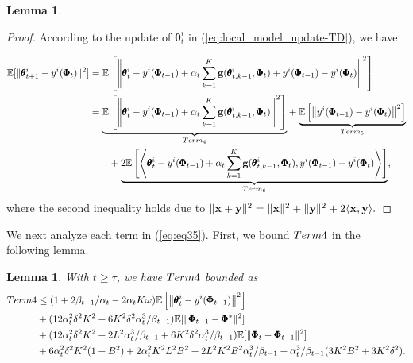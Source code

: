 \documentclass{article} %
\def\eqref#1{equation~\ref{#1}}
\theoremstyle{plain}
\newtheorem{lemma}[theorem]{Lemma}
\theoremstyle{definition}
\theoremstyle{remark}
\renewcommand{\eqref}[1]{(\ref{#1})}
\begin{document}
{\begin{lemma}
\end{lemma}


\begin{proof}
According to the  update of $\pmb{\theta}_t^i$ in \eqref{eq:local_model_update-TD}, we have

\begin{align}\label{eq:eq35}
    \mathbb{E}[\|\pmb{\theta}^i_{t+1}-y^i(\pmb{\Phi}_t)\|^2]&=\mathbb{E}\left[\left\|\pmb{\theta}_{t}^i-y^i(\pmb{\Phi}_{t-1})+\alpha_t\sum_{k=1}^K\bg(\pmb{\theta}_{t,k-1}^i,\pmb{\Phi}_t)+y^i(\pmb{\Phi}_{t-1})-y^i(\pmb{\Phi}_{t})\right\|^2\right]\nonumber\allowdisplaybreaks\\
    &=\underset{Term_4}{\underbrace{\mathbb{E} \left[\left\|\pmb{\theta}_{t}^i-y^i(\pmb{\Phi}_{t-1})+\alpha_t\sum_{k=1}^K\bg(\pmb{\theta}_{t,k-1}^i,\pmb{\Phi}_t)\right\|^2\right]}}+\underset{Term_5}{\underbrace{\mathbb{E}\left[\left\|y^i(\pmb{\Phi}_{t-1})-y^i(\pmb{\Phi}_{t})\right\|^2\right]}}\nonumber\allowdisplaybreaks\\
    &\qquad+\underset{Term_6}{\underbrace{2\mathbb{E}\left[\left\langle\pmb{\theta}_{t}^i-y^i(\pmb{\Phi}_{t-1})+\alpha_t\sum_{k=1}^K\bg(\pmb{\theta}_{t,k-1}^i,\pmb{\Phi}_t),y^i(\pmb{\Phi}_{t-1})-y^i(\pmb{\Phi}_{t})\right\rangle\right]}},
\end{align}
where the second inequality holds due to $\|{\mathbf{x}}+{\mathbf{y}}\|^2=\|{\mathbf{x}}\|^2+\|{\mathbf{y}}\|^2+2\langle{\mathbf{x}}, {\mathbf{y}}\rangle.$




\end{proof}



We next analyze each term in \eqref{eq:eq35}. {First, we bound $\textnormal{Term 4}$ in the following lemma.}

\begin{lemma}\label{lemma:Term_4}
With $t\geq \tau$, we have $\textnormal{Term 4}$ bounded as
\begin{align}
    \textnormal{Term 4}&\leq (1+2\beta_{t-1}/\alpha_t-2\alpha_tK\omega)\mathbb{E}\left[\left\|\pmb{\theta}_{t}^i-y^i(\pmb{\Phi}_{t-1})\right\|^2 \right]\nonumber\allowdisplaybreaks\\
    &+(12\alpha_t^2\delta^2K^2+6K^2\delta^2\alpha_t^3/\beta_{t-1})\mathbb{E}[\|\pmb{\Phi}_{t-1}-\pmb{\Phi}^*\|^2]\nonumber\allowdisplaybreaks\\
    &+(12\alpha_t^2\delta^2K^2+2L^2\alpha_t^3/\beta_{t-1}+6K^2\delta^2\alpha_t^3/\beta_{t-1})\mathbb{E}[\|\pmb{\Phi}_{t}-\pmb{\Phi}_{t-1}\|^2]\nonumber\allowdisplaybreaks\\
    &+6\alpha_t^2\delta^2K^2(1+B^2)+2\alpha_t^2K^2L^2B^2+2L^2K^2B^2\alpha_t^3/\beta_{t-1}+\alpha_t^3/\beta_{t-1}(3K^2B^2+3K^2\delta^2). 
\end{align}


\end{lemma}}
\end{document}
